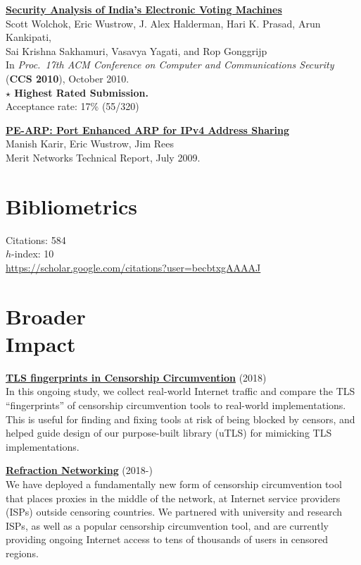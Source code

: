 \documentclass[margin,11pt]{res} %
\begin{document}
    \textbf{\href{http://www.cse.umich.edu/~jhalderm/pub/papers/evm-ccs10.pdf}{Security Analysis of India's Electronic Voting  Machines}} \\ 
        Scott Wolchok, Eric Wustrow, J. Alex Halderman, Hari K. Prasad, Arun Kankipati, \\
        Sai Krishna Sakhamuri, Vasavya Yagati, and Rop Gonggrijp \\
        In \emph{Proc.\ 17th ACM Conference on Computer and Communications Security} \\
        (\textbf{CCS 2010}), October 2010. \\
        \textbf{$\star$ Highest Rated Submission.} \\
        Acceptance rate: 17\% (55/320)

    \textbf{\href{https://ericw.us/trow/pe-arp.pdf}{PE-ARP: Port Enhanced ARP for IPv4 Address Sharing}} \\
        Manish Karir, Eric Wustrow, Jim Rees \\
        Merit Networks Technical Report, July 2009.

\vspace{6pt}
\section{\large Bibliometrics}

Citations: 584\\
$h$-index: 10\\
\url{https://scholar.google.com/citations?user=becbtxgAAAAJ}
\fi



\vspace{6pt}
\section{\large Broader\\Impact}

\textbf{\href{https://tlsfingerprint.io}{TLS fingerprints in Censorship Circumvention}} (2018) \\
In this ongoing study, we collect real-world Internet traffic and compare the TLS ``fingerprints'' of censorship circumvention tools to real-world implementations. This is useful for finding and fixing tools at risk of being blocked by censors, and helped guide design of our purpose-built library (uTLS) for mimicking TLS implementations.

\textbf{\href{https://refraction.network}{Refraction Networking}} (2018-) \\
We have deployed a fundamentally new form of censorship circumvention tool that places proxies in the middle of the network, at Internet service providers (ISPs) outside censoring countries. We partnered with university and research ISPs, as well as a popular censorship circumvention tool, and are currently providing ongoing Internet access to tens of thousands of users in censored regions.
\end{document}
